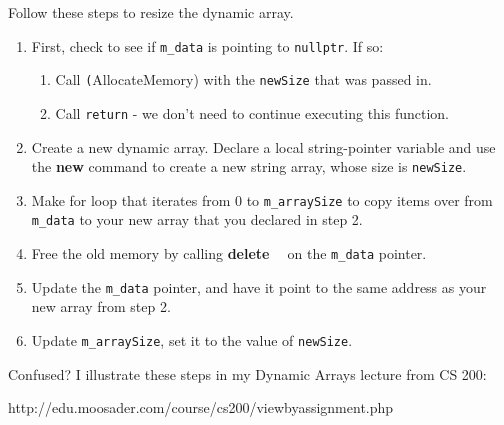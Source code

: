 \documentclass[a4paper,12pt]{book}
\begin{document}
    Follow these steps to resize the dynamic array.

    \begin{enumerate}
        \item First, check to see if \texttt{m\_data} is pointing to \texttt{nullptr}. If so:
            \begin{enumerate}
                \item Call \texttt(AllocateMemory) with the \texttt{newSize} that was passed in.
                \item Call \texttt{return} - we don't need to continue executing this function.
            \end{enumerate}

        \item Create a new dynamic array. Declare a local string-pointer variable
            and use the \textbf{new} command to create a new string array,
            whose size is \texttt{newSize}.

        \item Make for loop that iterates from 0 to \texttt{m\_arraySize} to copy items over
            from \texttt{m\_data} to your new array that you declared in step 2.

        \item Free the old memory by calling \textbf{delete \lbrack \ \rbrack} on
            the \texttt{m\_data} pointer.

        \item Update the \texttt{m\_data} pointer, and have it point to the same
            address as your new array from step 2.

        \item Update \texttt{m\_arraySize}, set it to the value of \texttt{newSize}.
    \end{enumerate}

    \begin{hint}{Confused?}
        I illustrate these steps in my Dynamic Arrays lecture from CS 200:

        http://edu.moosader.com/course/cs200/viewbyassignment.php
    \end{hint}

    
\end{document}

